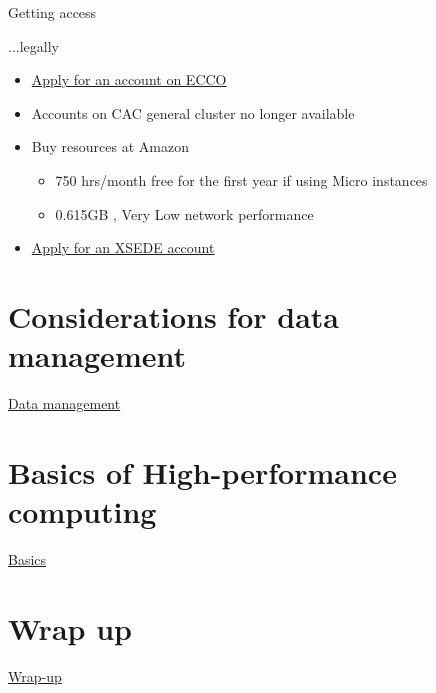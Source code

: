 \documentclass[xcolor=table,compress]{beamer}
\begin{document}
\begin{frame}{Getting access}
\begin{block}{...legally}
\begin{itemize}
\item \href{http://www2.vrdc.cornell.edu/news/ecco/step-1-requesting-an-ecco-account/}{Apply for an account on ECCO}
\item Accounts on CAC general cluster no longer available
\item Buy resources at Amazon 
\begin{itemize}
\item 750 hrs/month free for the first year if using Micro instances
\item 0.615GB	, Very Low network performance
\end{itemize}
\item \href{https://www.xsede.org/using-xsede\#step3}{Apply for an XSEDE account}
\end{itemize}
\end{block}
\end{frame}



\section[Data mgmt]{Considerations for data management}
\begin{frame}
\href{day3-2.pdf}{Data management}
\end{frame}
\section[Basics]{Basics of High-performance computing}
\begin{frame}
\href{day3-1.pdf}{Basics}
\end{frame}


\section{Wrap up}

\begin{frame}
\href{day3-4.pdf}{Wrap-up}
\end{frame}
\end{document}
